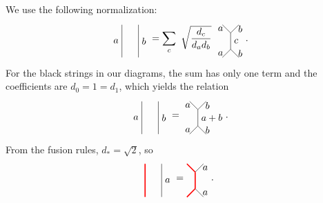 We use the following normalization\cite{Bonderson,BSS08}:
	\begin{equation}
		\begin{tikzpicture}[scale=1.2,baseline=(current bounding box.center)]
			\draw (0,0) to node [left] {$a$} (0,1);
			\draw (0.5,0) to node [right] {$b$} (0.5,1);
		\end{tikzpicture}=\sum_c\ \sqrt{\frac{d_c}{d_a d_b}}\ 
		\begin{tikzpicture}[scale=1.2,baseline=(current bounding box.center)]
			\draw (0,0) to node [left] {$a$} (0.25,0.25);
			\draw (0.5,0) to node [right] {$b$} (0.25,0.25);
			\draw (0,1) to node [left] {$a$} (0.25,0.75);
			\draw (0.5,1) to node [right] {$b$} (0.25,0.75);
			\draw (0.25,0.25) to node [right] {$c$} (0.25,0.75);
		\end{tikzpicture}.
	\end{equation}
For the black strings in our diagrams, the sum has only one term and the coefficients are $d_0=1=d_1$, which yields the relation
	\begin{equation}
	\label{eq:completeness}
		\begin{tikzpicture}[scale=1.2,baseline=(current bounding box.center)]
			\draw (0,0) to node [left] {$a$} (0,1);
			\draw (0.5,0) to node [right] {$b$} (0.5,1);
		\end{tikzpicture}=
		\begin{tikzpicture}[scale=1.2,baseline=(current bounding box.center)]
			\draw (0,0) to node [left] {$a$} (0.25,0.25);
			\draw (0.5,0) to node [right] {$b$} (0.25,0.25);
			\draw (0,1) to node [left] {$a$} (0.25,0.75);
			\draw (0.5,1) to node [right] {$b$} (0.25,0.75);
			\draw (0.25,0.25) to node [right] {$a+b$} (0.25,0.75);
		\end{tikzpicture}.
	\end{equation}
From the fusion rules, $d_*=\sqrt{2}$, so
\begin{equation}
\label{eq:completeness2}
\begin{tikzpicture}[scale=1.2,baseline=(current bounding box.center)]
\draw[red,line width=0.4mm] (0,0) to (0,1);
\draw (0.5,0) to node [right] {$a$} (0.5,1);
\end{tikzpicture}=
\begin{tikzpicture}[scale=1.2,baseline=(current bounding box.center)]
\draw[red,line width=0.4mm] (0,0) to (0.25,0.25);
\draw (0.5,0) to node [right] {$a$} (0.25,0.25);
\draw[red,line width=0.4mm] (0,1) to (0.25,0.75);
\draw (0.5,1) to node [right] {$a$} (0.25,0.75);
\draw[red,line width=0.4mm] (0.25,0.25) to (0.25,0.75);
\end{tikzpicture}.
\end{equation}
